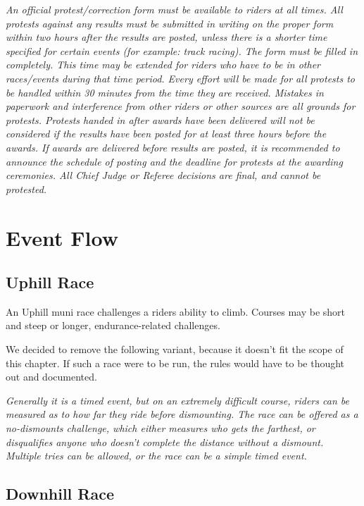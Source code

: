 \textit{An official protest/correction form must be available to riders at all times. All
protests against any results must be submitted in writing on the proper form within
two hours after the results are posted, unless there is a shorter time specified for certain
events (for example: track racing). The form must be filled in completely. This time
may be extended for riders who have to be in other races/events during that time period.
Every effort will be made for all protests to be handled within 30 minutes from the time
they are received. Mistakes in paperwork and interference from other riders or other
sources are all grounds for protests. Protests handed in after awards have been delivered
will not be considered if the results have been posted for at least three hours before the
awards. If awards are delivered before results are posted, it is recommended to announce
the schedule of posting and the deadline for protests at the awarding ceremonies. All
Chief Judge or Referee decisions are final, and cannot be protested.}

\section{Event Flow}

\subsection{Uphill Race \label{sec:muni_uphill}}

An Uphill muni race challenges a riders ability to climb.
Courses may be short and steep or longer, endurance-related challenges. 

\begin{framed}
We decided to remove the following variant, because it doesn't fit the
scope of this chapter.  If such a race were to be run,
the rules would have to be thought out and documented.
\end{framed}

\textit{Generally it is a timed event, but on an extremely difficult course, riders can be measured as to how far they ride before dismounting.
The race can be offered as a no-dismounts challenge, which either measures who gets the farthest, or disqualifies anyone who doesn't complete the distance without a dismount.
Multiple tries can be allowed, or the race can be a simple timed event.}

\subsection{Downhill Race \label{sec:muni_downhill}}

